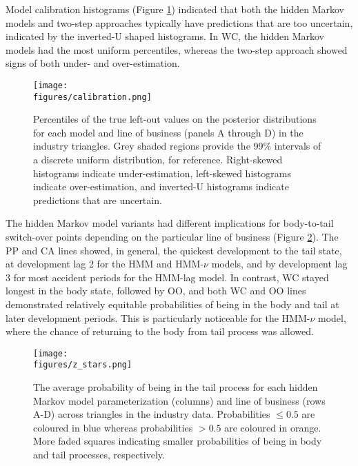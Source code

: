 Model calibration histograms (Figure \ref{fig:percentiles})
indicated that both the hidden Markov models
and two-step approaches typically have predictions that
are too uncertain, indicated by the inverted-U shaped
histograms. In WC, the hidden Markov models had the most
uniform percentiles, whereas the two-step approach
showed signs of both under- and over-estimation.

\begin{figure}
    \centering
    \texttt{[image: \\figures/calibration.png]}
    \caption{
        Percentiles of the true left-out values on the posterior distributions
        for each model and line of business (panels A through D) in the industry triangles.
        Grey shaded regions provide the 99\% intervals of a discrete uniform
        distribution, for reference.
        Right-skewed histograms indicate under-estimation,
        left-skewed histograms indicate over-estimation,
        and inverted-U histograms indicate predictions that
        are uncertain.
    }
    \label{fig:percentiles}
\end{figure}

The hidden Markov model variants had different
implications for body-to-tail switch-over points
depending on the particular line of business
(Figure \ref{fig:zstars}).
The PP and CA lines showed, in general,
the quickest development to the tail
state, at development lag 2 for the HMM
and HMM-$\nu$ models, and by development
lag 3 for most accident periods for the
HMM-lag model. In contrast, WC stayed
longest in the body state, followed by
OO, and both WC and OO lines demonstrated
relatively equitable probabilities of being
in the body and tail at later development
periods. This is particularly noticeable for
the HMM-$\nu$ model, where the chance
of returning to the body from tail process
was allowed.

\begin{figure}
    \centering
    \texttt{[image: \\figures/z\_stars.png]}
    \caption{
        The average probability of being in the tail process
        for each hidden Markov model parameterization (columns)
        and line of business (rows A-D) across triangles
        in the industry data.
        Probabilities $\leq 0.5$ are coloured
        in blue whereas probabilities $> 0.5$
        are coloured in orange. More faded squares
        indicating smaller probabilities of being
        in body and tail processes, respectively.
    }
    \label{fig:zstars}
\end{figure}

